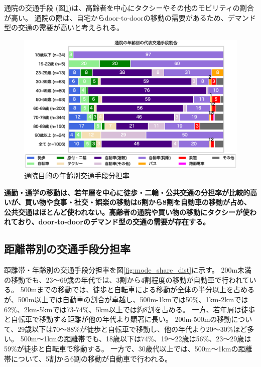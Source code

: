 \documentclass[a4paper,12pt, uplatex]{jsbook}
\begin{document}
通院の交通手段 (図\ref{fig:mode_share_hospital})は、高齢者を中心にタクシーやその他のモビリティの割合が高い。
通院の際は、自宅からdoor-to-doorの移動の需要があるため、デマンド型の交通の需要が高いと考えられる。
%
\begin{figure}[htbp]
    \centering
    \includegraphics[width=1.0\textwidth]{picture/mode_share_通院_age.eps}
    \caption{通院目的の年齢別交通手段分担率}
    \label{fig:mode_share_hospital}
\end{figure}

\clearpage
\color{red}
\begin{framed}
\noindent
\textbf{\large 通勤・通学の移動は、若年層を中心に徒歩・二輪・公共交通の分担率が比較的高いが、買い物や食事・社交・娯楽の移動は6割から8割を自動車の移動が占め、公共交通はほとんど使われない。高齢者の通院や買い物の移動にタクシーが使われており、door-to-doorのデマンド型の交通の需要が存在する。}
\end{framed}
\color{black}



\clearpage
\subsection{距離帯別の交通手段分担率}

距離帯・年齢別の交通手段分担率を図\ref{fig:mode_share_dist}に示す。
200m未満の移動でも、23〜69歳の年代では、3割から4割程度の移動が自動車で行われている。
500mまでの移動では、徒歩と自転車による移動が全体の半分以上を占めるが、500m以上では自動車の割合が卓越し、500m-1kmでは50\%、1km-2kmでは62\%、2km-5kmでは73-74\%、5km以上では約8割を占める。
一方、若年層は徒歩と自転車で移動する距離が他の年代より顕著に長い。
200m-500mの移動について、29歳以下は70〜88\%が徒歩と自転車で移動し、他の年代より20〜30\%ほど多い。
500m〜1kmの距離帯でも、18歳以下は74\%、19〜22歳は56\%、23〜29歳は59\%が徒歩と自転車で移動する。
一方で、30歳代以上では、500m〜1kmの距離帯について、5割から6割の移動が自動車で行われる。
\end{document}
